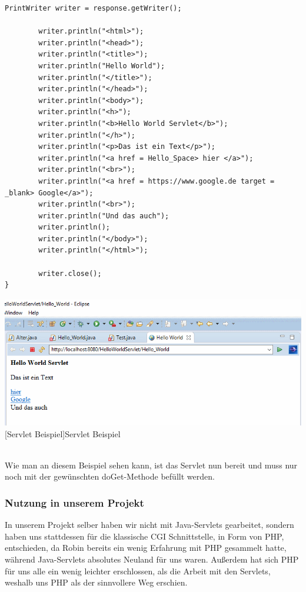 \documentclass[12pt,a4paper,bibliography=totocnumbered,listof=totocnumbered]{scrartcl}
\begin{document}
\begin{minipage}{\linewidth}
\begin{lstlisting}[caption=Servlet Beispielcode, label=lst:servlet-html]
	PrintWriter writer = response.getWriter();
	
		writer.println("<html>");
		writer.println("<head>");
		writer.println("<title>");
		writer.println("Hello World");
		writer.println("</title>");
		writer.println("</head>");
		writer.println("<body>");
		writer.println("<h>");
		writer.println("<b>Hello World Servlet</b>");
		writer.println("</h>");
		writer.println("<p>Das ist ein Text</p>");
		writer.println("<a href = Hello_Space> hier </a>");
		writer.println("<br>");
		writer.println("<a href = https://www.google.de target = _blank> Google</a>");
		writer.println("<br>");
		writer.println("Und das auch");
		writer.println();
		writer.println("</body>");
		writer.println("</html>");
		
		writer.close();		
}			
\end{lstlisting}


\vspace{1em}
\begin{minipage}{\linewidth}
	\centering
	\includegraphics[width=0.9\linewidth]{Bilder/Servlet-Beispiel.png}
	[Servlet Beispiel]{Servlet Beispiel}	
	\label{fig:eclipse6}
\end{minipage}
\\

Wie man an diesem Beispiel sehen kann, ist das Servlet nun bereit und muss nur noch mit der gewünschten doGet-Methode befüllt werden.
\subsubsection{Nutzung in unserem Projekt}
In unserem Projekt selber haben wir nicht mit Java-Servlets gearbeitet, sondern haben uns stattdessen für die klassische CGI Schnittstelle, in Form von PHP, entschieden, da Robin bereits ein wenig Erfahrung mit PHP gesammelt hatte, während Java-Servlets absolutes Neuland für uns waren.
Außerdem hat sich PHP für uns alle ein wenig leichter erschlossen, als die Arbeit mit den Servlets, weshalb uns PHP als der sinnvollere Weg erschien.



\end{minipage}
\end{document}
